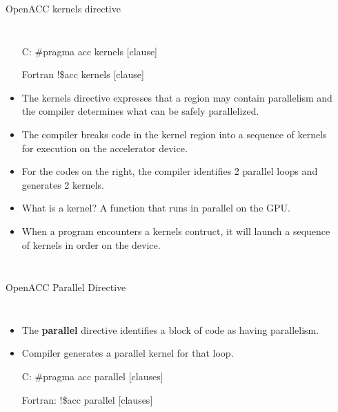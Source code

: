 \documentclass[c,mathserif,compress,xcolor=svgnames]{beamer}
\newenvironment{eblock}[0]
{
\begin{beamerboxesrounded}[upper=uppercol2,lower=lowercol2,shadow=true]}
{\end{beamerboxesrounded}}
\begin{document}
\begin{frame}[fragile]{\small OpenACC kernels directive}
  \begin{columns}
    \begin{itemize}
      \item[C:] {\color{red!90!black}\#pragma acc kernels [clause]}
      \item[Fortran] {\color{red!90!black}!\$acc kernels [clause]}
      \item The kernels directive expresses that a region may contain parallelism and the compiler determines what can be safely parallelized.
      \item The compiler breaks code in the kernel region into a sequence of kernels for execution on the accelerator device.
      \item For the codes on the right, the compiler identifies 2 parallel loops and generates 2 kernels.
      \item {\color{red}What is a kernel?} {\color{DarkGreen}A function that runs in parallel on the GPU.}
      \item When a program encounters a kernels contruct, it will launch a sequence of kernels in order on the device.
    \end{itemize}
    \begin{eblock}{}
      
      
    \end{eblock}
  \end{columns}
\end{frame}

\begin{frame}{\small OpenACC Parallel Directive}
  \begin{columns}
    \begin{itemize}
      \item The {\bf parallel} directive identifies a block of code as having parallelism.
      \item Compiler generates a parallel kernel for that loop.
      \item[C:] {\color{red!90!black}\#pragma acc parallel [clauses]}
      \item[Fortran:] {\color{red!90!black}!\$acc parallel [clauses]}
    \end{itemize}
    \begin{eblock}{}
      
      
    \end{eblock}
  \end{columns}
\end{frame}
\end{document}
